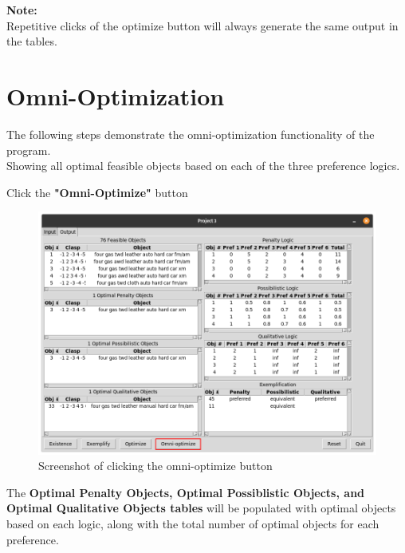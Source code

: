 \documentclass[12pt]{report}
\begin{document}
\textbf{Note:} \\
Repetitive clicks of the optimize button will always generate the same output in the tables.

\section{Omni-Optimization}
The following steps demonstrate the omni-optimization functionality of the program. \\
Showing all optimal feasible objects based on each of the three preference logics.\\

\begin{description}[leftmargin=4em]
\item [Step 1:]  Click the \textbf{"Omni-Optimize"} button
\begin{figure}[H]
\begin{center}
\includegraphics[scale=0.3,trim=1cm 1cm 1cm 1cm]{omni-optimize}
\caption{Screenshot of clicking the omni-optimize button}
\end{center}
\end{figure}
\vspace{-2.5em}
\item [Result:] The \textbf{Optimal Penalty Objects, Optimal Possiblistic Objects, and Optimal Qualitative Objects tables} will be populated with optimal objects based on each logic, along with the total number of optimal objects for each preference.
\begin{figure}[H]
\begin{center}

\end{center}
\end{figure}
\end{description}
\end{document}
